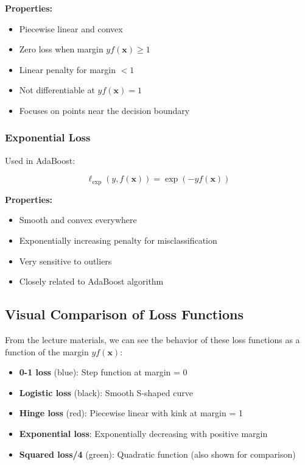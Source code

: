 \documentclass[12pt,a4paper]{article}
\begin{document}
\textbf{Properties:}
\begin{itemize}
    \item Piecewise linear and convex
    \item Zero loss when margin $yf(\mathbf{x}) \geq 1$
    \item Linear penalty for margin $< 1$
    \item Not differentiable at $yf(\mathbf{x}) = 1$
    \item Focuses on points near the decision boundary
\end{itemize}

\subsubsection{Exponential Loss}

Used in AdaBoost:

\begin{equation}
\ell_{\text{exp}}(y, f(\mathbf{x})) = \exp(-yf(\mathbf{x}))
\end{equation}

\textbf{Properties:}
\begin{itemize}
    \item Smooth and convex everywhere
    \item Exponentially increasing penalty for misclassification
    \item Very sensitive to outliers
    \item Closely related to AdaBoost algorithm
\end{itemize}

\subsection{Visual Comparison of Loss Functions}

From the lecture materials, we can see the behavior of these loss functions as a function of the margin $yf(\mathbf{x})$:

\begin{itemize}
    \item \textbf{0-1 loss} (blue): Step function at margin = 0
    \item \textbf{Logistic loss} (black): Smooth S-shaped curve
    \item \textbf{Hinge loss} (red): Piecewise linear with kink at margin = 1
    \item \textbf{Exponential loss}: Exponentially decreasing with positive margin
    \item \textbf{Squared loss/4} (green): Quadratic function (also shown for comparison)
\end{itemize}
\end{document}

